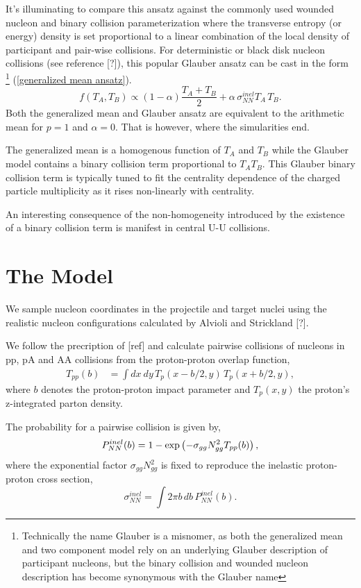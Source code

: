 \documentclass[aps,prl,reprint,amsmath,nofootinbib]{revtex4-1}
\begin{document}
It's illuminating to compare this ansatz against the commonly used wounded nucleon and binary collision parameterization where the transverse entropy (or energy) density 
is set proportional to a linear combination of the local density of participant and pair-wise collisions. For deterministic or black disk nucleon collisions 
(see reference [?]), this popular Glauber ansatz can be cast in the form \footnote{Technically the name Glauber is a misnomer, as both the generalized mean and 
two component model rely on an underlying Glauber description of participant nucleons, but the binary collision and wounded nucleon description has become synonymous
with the Glauber name}
(\ref{generalized mean ansatz}). 
\begin{equation}
 f(T_A,T_B) \propto (1-\alpha)\frac{T_A+T_B}{2} + \alpha \, \sigma^{inel}_{NN} T_A\, T_B. 
\end{equation}
Both the generalized mean and Glauber ansatz are equivalent to the arithmetic mean for $p=1$ and $\alpha=0$. That is however, where the simularities end. 

The generalized mean is a homogenous function of $T_A$ and $T_B$ while the Glauber model contains a binary collision term proportional to $T_A T_B$. This Glauber
binary collision term is typically tuned to fit the centrality dependence of the charged particle multiplicity as it rises non-linearly with centrality.

An interesting consequence of the non-homogeneity introduced by the existence of a binary collision term is manifest in central U-U collisions.


\section{The Model}
We sample nucleon coordinates in the projectile and target nuclei using the realistic nucleon configurations calculated by Alvioli 
and Strickland [?].

We follow the precription of [ref] and calculate pairwise collisions of nucleons in pp, pA and AA collisions from the proton-proton 
overlap function,
\begin{align}
 T_{pp}(b) &= \int dx~dy \,T_p(x-b/2,y) \,T_p(x+b/2,y),
\end{align}
where $b$ denotes the proton-proton impact parameter and $T_p(x,y)$ the proton's z-integrated parton density.

The probability for a pairwise collision is given by,
\begin{equation}
  P^{inel}_{NN}(b) = 1 - \exp \left(-\sigma_{gg} N_{gg}^2 T_{pp}(b) \right), \\[1ex]
\end{equation}
where the exponential factor $\sigma_{gg} N_{gg}^2$ is fixed to reproduce the inelastic proton-proton cross section,
\begin{equation}
  \sigma^{inel}_{NN} = \int 2 \pi b \,db \, P_{NN}^{inel}(b).
\end{equation}
\end{document}
